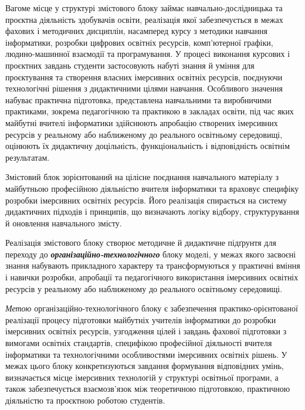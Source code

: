 Вагоме місце у структурі змістового блоку займає навчально-дослідницька та проєктна діяльність здобувачів освіти, реалізація якої забезпечується в межах фахових і методичних дисциплін, насамперед курсу з методики навчання інформатики, розробки цифрових освітніх ресурсів, комп'ютерної графіки, людино-машинної взаємодії та програмування. У процесі виконання курсових і проєктних завдань студенти застосовують набуті знання й уміння для проєктування та створення власних імерсивних освітніх ресурсів, поєднуючи технологічні рішення з дидактичними цілями навчання. Особливого значення набуває практична підготовка, представлена навчальними та виробничими практиками, зокрема педагогічною та практикою в закладах освіти, під час яких майбутні вчителі інформатики здійснюють апробацію створених імерсивних ресурсів у реальному або наближеному до реального освітньому середовищі, оцінюють їх дидактичну доцільність, функціональність і відповідність освітнім результатам.

Змістовий блок зорієнтований на цілісне поєднання навчального матеріалу з майбутньою професійною діяльністю вчителя інформатики та враховує специфіку розробки імерсивних освітніх ресурсів. Його реалізація спирається на систему дидактичних підходів і принципів, що визначають логіку відбору, структурування й оновлення навчального змісту.

Реалізація змістового блоку створює методичне й дидактичне підґрунтя для переходу до \emph{\textbf{організаційно-технологічного}} блоку моделі, у межах якого засвоєні знання набувають прикладного характеру та трансформуються у практичні вміння і навички розробки, апробації та педагогічного використання імерсивних освітніх ресурсів у реальному або наближеному до реального освітньому середовищі.

\emph{Метою} організаційно-технологічного блоку є забезпечення практико-орієнтованої реалізації процесу підготовки майбутніх учителів інформатики до розробки імерсивних освітніх ресурсів, узгодження цілей і завдань фахової підготовки з вимогами освітніх стандартів, специфікою професійної діяльності вчителя інформатики та технологічними особливостями імерсивних освітніх рішень. У межах цього блоку конкретизуються завдання формування відповідних умінь, визначається місце імерсивних технологій у структурі освітньої програми, а також забезпечується взаємозв'язок між теоретичною підготовкою, практичною діяльністю та проєктною роботою студентів.

